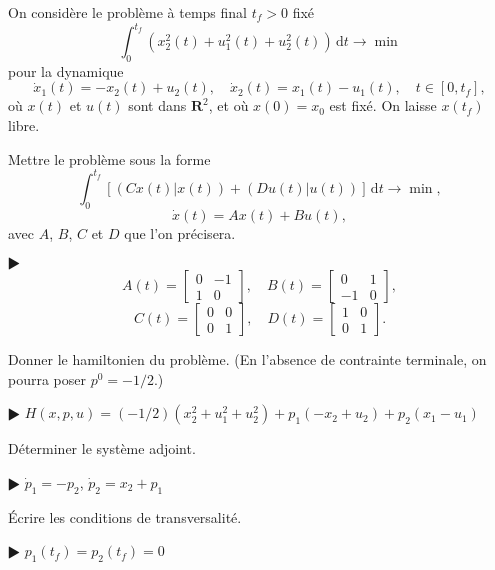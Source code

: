 \documentclass[11pt,a4paper]{article}
\def\R{\mathbf{R}}
\def\d{\mathrm{d}}
\theoremstyle{plain}
\theoremstyle{definition}
\begin{document}
\begin{Exercice}[6 points] On consid\`ere le probl\`eme \`a temps final $t_f>0$ fix\'e
\[ \int_0^{t_f} (x_2^2(t)+u_1^2(t)+u_2^2(t))\,\d t \to \min \]
pour la dynamique
\[ \dot{x}_1(t)=-x_2(t)+u_2(t),\quad
   \dot{x}_2(t)= x_1(t)-u_1(t),\quad t \in [0,t_f], \]
o\`u $x(t)$ et $u(t)$ sont dans $\R^2$, et o\`u $x(0)=x_0$ est fix\'e. On laisse
$x(t_f)$ libre.
\begin{Question} Mettre le probl\`eme sous la forme
\[ \int_0^{t_f} \left[ (Cx(t)|x(t))+(Du(t)|u(t)) \right]\,\d t \to \min, \]
\[ \dot{x}(t) = Ax(t)+Bu(t), \]
avec $A$, $B$, $C$ et $D$ que l'on pr\'ecisera. 
\end{Question}
\begin{corr} $\RHD$
\[ A(t) = \left[ \begin{array}{rr}
  0 & -1\\
  1 & 0 \end{array} \right],\quad
   B(t) = \left[ \begin{array}{rr}
  0 & 1\\
 -1 & 0 \end{array} \right], \]
\[ C(t) = \left[ \begin{array}{rr}
  0 & 0\\
  0 & 1 \end{array} \right],\quad
   D(t) = \left[ \begin{array}{rr}
  1 & 0\\
  0 & 1 \end{array} \right]. \]
\end{corr}

\begin{Question} Donner le hamiltonien du probl\`eme. (En l'absence de contrainte
terminale, on pourra poser $p^0=-1/2$.)
\end{Question}
\begin{corr} $\RHD$ $H(x,p,u)=(-1/2)(x_2^2+u_1^2+u_2^2)+p_1(-x_2+u_2)+p_2(x_1-u_1)$
\end{corr}

\begin{Question} D\'eterminer le syst\`eme adjoint.
\end{Question}
\begin{corr} $\RHD$ $\dot{p}_1=-p_2$, $\dot{p}_2=x_2+p_1$
\end{corr}

\begin{Question} \'Ecrire les conditions de transversalit\'e. 
\end{Question}
\begin{corr} $\RHD$ $p_1(t_f)=p_2(t_f)=0$
\end{corr}


\end{Exercice}
\end{document}
